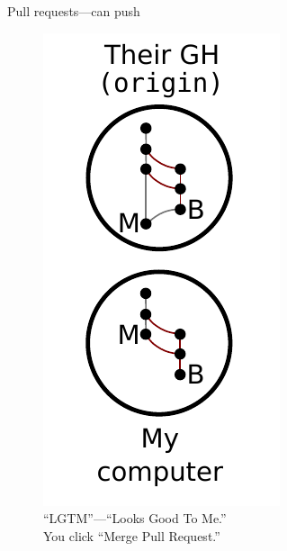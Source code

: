 \begin{frame}{Pull requests---can push}
  \begin{figure}
    \includegraphics{push_011.pdf}
    \\ ``LGTM''---``Looks Good To Me.''
    \\ You click ``Merge Pull Request.''
  \end{figure}
\end{frame}

